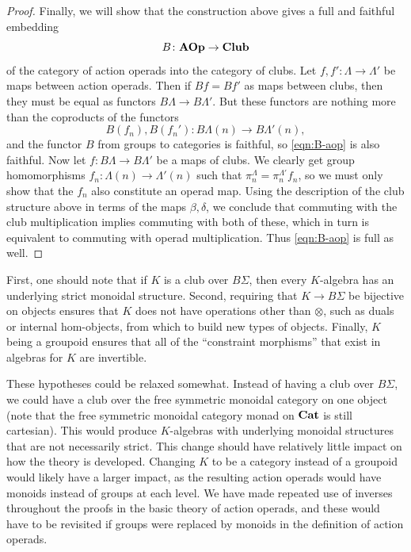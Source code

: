 \begin{proof}
Finally, we will show that the construction above gives a full and faithful embedding
    \begin{equation}\label{eqn:B-aop}
        B \colon \mathbf{AOp} \rightarrow \mathbf{Club}
    \end{equation}
of the category of action operads into the category of clubs. Let $f, f' \colon \Lambda \rightarrow \Lambda'$ be maps between action operads. Then if $Bf = Bf'$ as maps between clubs, then they must be equal as functors $B\Lambda \rightarrow B\Lambda'$. But these functors are nothing more than the coproducts of the functors
  \[
    B(f_{n}), B(f_{n}') \colon B\Lambda(n) \rightarrow B\Lambda'(n),
  \]
and the functor $B$ from groups to categories is faithful, so \cref{eqn:B-aop} is also faithful. Now let $f \colon B\Lambda \rightarrow B\Lambda'$ be a maps of clubs. We clearly get group homomorphisms $f_{n} \colon \Lambda(n) \rightarrow \Lambda'(n)$ such that $\pi^{\Lambda}_{n} = \pi^{\Lambda'}_{n} f_{n}$, so we must only show that the $f_{n}$ also constitute an operad map. Using the description of the club structure above in terms of the maps $\beta, \delta$, we conclude that commuting with the club multiplication implies commuting with both of these, which in turn is equivalent to commuting with operad multiplication. Thus \cref{eqn:B-aop} is full as well.
\end{proof}

\begin{rem}[(Relaxing the hypotheses in \cref{thm:club=operad})]
First, one should note that if $K$ is a club over $B\Sigma$, then every $K$-algebra has an underlying strict monoidal structure. Second, requiring that $K \rightarrow B\Sigma$ be bijective on objects ensures that $K$ does not have  operations other than $\otimes$, such as duals or internal hom-objects, from which to build new types of objects. Finally, $K$ being a groupoid ensures that all of the ``constraint morphisms'' that exist in algebras for $K$ are invertible.

These hypotheses could be relaxed somewhat. Instead of having a club over $B\Sigma$, we could have a club over the free symmetric monoidal category on one object (note that the free symmetric monoidal category monad on $\mathbf{Cat}$ is still cartesian). This would produce $K$-algebras with underlying monoidal structures that are not necessarily strict. This change should have relatively little impact on how the theory is developed. Changing $K$ to be a category instead of a groupoid would likely have a larger impact, as the resulting action operads would have monoids instead of groups at each level. We have made repeated use of inverses throughout the proofs in the basic theory of action operads, and these would have to be revisited if groups were replaced by monoids in the definition of action operads.
\end{rem}


